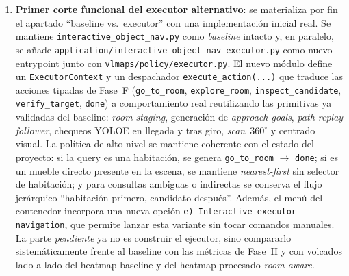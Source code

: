 \documentclass[11pt,a4paper]{article}
\begin{document}
\begin{enumerate}
  \item \textbf{Primer corte funcional del executor alternativo}: se materializa
        por fin el apartado ``baseline vs.\ executor'' con una implementación
        inicial real. Se mantiene \texttt{interactive\_object\_nav.py} como
        \emph{baseline} intacto y, en paralelo, se añade
        \texttt{application/interactive\_object\_nav\_executor.py} como nuevo
        entrypoint junto con \texttt{vlmaps/policy/executor.py}. El nuevo
        módulo define un \texttt{ExecutorContext} y un despachador
        \texttt{execute\_action(...)} que traduce las acciones tipadas de
        Fase~F (\texttt{go\_to\_room}, \texttt{explore\_room},
        \texttt{inspect\_candidate}, \texttt{verify\_target},
        \texttt{done}) a comportamiento real reutilizando las primitivas ya
        validadas del baseline: \textit{room staging}, generación de
        \emph{approach goals}, \textit{path replay follower}, chequeos YOLOE
        en llegada y tras giro, \textit{scan}~$360^\circ$ y centrado visual.
        La política de alto nivel se mantiene coherente con el estado del
        proyecto: si la query es una habitación, se genera
        \texttt{go\_to\_room} $\rightarrow$ \texttt{done}; si es un mueble
        directo presente en la escena, se mantiene \textit{nearest-first}
        sin selector de habitación; y para consultas ambiguas o indirectas se
        conserva el flujo jerárquico ``habitación primero, candidato después''.
        Además, el menú del contenedor incorpora una nueva opción
        \texttt{e) Interactive executor navigation}, que permite lanzar esta
        variante sin tocar comandos manuales. La parte \emph{pendiente} ya no
        es construir el ejecutor, sino compararlo sistemáticamente frente al
        baseline con las métricas de Fase~H y con volcados lado a lado del
        heatmap baseline y del heatmap procesado \emph{room-aware}.


\end{enumerate}
\end{document}
